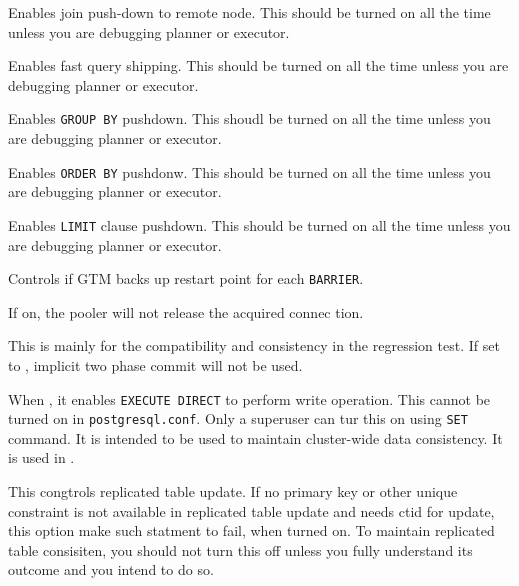     Enables join push-down to remote node.
    This should be turned on all the time unless you are debugging \XC{} planner or executor.
  
  
    Enables fast query shipping.
    This should be turned on all the time unless you are debugging \XC{} planner or executor.
  
  
    Enables \texttt{GROUP BY} pushdown.
    This shoudl be turned on all the time unless you are debugging \XC{} planner or executor.
  
  
    Enables \texttt{ORDER BY} pushdonw.
    This should be turned on all the time unless you are debugging \XC{} planner or executor.
  
  
    Enables \texttt{LIMIT} clause pushdown.
    This should be turned on all the time unless you are debugging \XC{} planner or executor.
  
  
    Controls if GTM backs up restart point for each \texttt{BARRIER}.
  
  
    If on, the pooler will not release the acquired connec tion.
  
  
    This is mainly for the compatibility and consistency in the regression test.
    If set to , implicit two phase commit will not be used.
  
  
    When , it enables \texttt{EXECUTE DIRECT} to perform write operation.
    This cannot be turned on in \texttt{postgresql.conf}.
    Only a superuser can tur this on using \texttt{SET} command.
    It is intended to be used to maintain cluster-wide data consistency.
    It is used in .
  
  
    This congtrols replicated table update.
    If no primary key or other unique constraint is not available in replicated table update and
	needs ctid for update, this option make such statment to fail, when turned on.
    To maintain replicated table consisiten, you should not turn this off unless you fully
	understand its outcome and you intend to do so.
  
